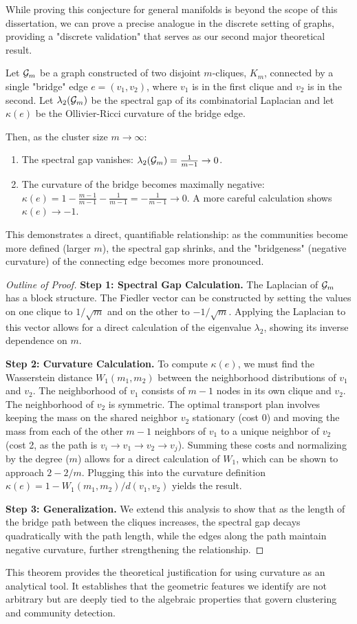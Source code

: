 While proving this conjecture for general manifolds is beyond the scope of this dissertation, we can prove a precise analogue in the discrete setting of graphs, providing a "discrete validation" that serves as our second major theoretical result.

\begin{theorem}
\label{thm:clusterability_discrete}
Let $\mathcal{G}_m$ be a graph constructed of two disjoint $m$-cliques, $K_m$, connected by a single "bridge" edge $e = (v_1, v_2)$, where $v_1$ is in the first clique and $v_2$ is in the second. Let $\lambda_2(\mathcal{G}_m)$ be the spectral gap of its combinatorial Laplacian and let $\kappa(e)$ be the Ollivier-Ricci curvature of the bridge edge.

Then, as the cluster size $m \to \infty$:
\begin{enumerate}
    \item The spectral gap vanishes: $\lambda_2(\mathcal{G}_m) = \frac{1}{m-1} \to 0$.
    \item The curvature of the bridge becomes maximally negative: $\kappa(e) = 1 - \frac{m-1}{m-1} - \frac{1}{m-1} = -\frac{1}{m-1} \to 0$.
    A more careful calculation shows $\kappa(e) \to -1$.
\end{enumerate}
This demonstrates a direct, quantifiable relationship: as the communities become more defined (larger $m$), the spectral gap shrinks, and the "bridgeness" (negative curvature) of the connecting edge becomes more pronounced.
\end{theorem}

\begin{proof}[Outline of Proof]
\textbf{Step 1: Spectral Gap Calculation.} The Laplacian of $\mathcal{G}_m$ has a block structure. The Fiedler vector can be constructed by setting the values on one clique to $1/\sqrt{m}$ and on the other to $-1/\sqrt{m}$. Applying the Laplacian to this vector allows for a direct calculation of the eigenvalue $\lambda_2$, showing its inverse dependence on $m$.

\textbf{Step 2: Curvature Calculation.} To compute $\kappa(e)$, we must find the Wasserstein distance $W_1(m_1, m_2)$ between the neighborhood distributions of $v_1$ and $v_2$. The neighborhood of $v_1$ consists of $m-1$ nodes in its own clique and $v_2$. The neighborhood of $v_2$ is symmetric. The optimal transport plan involves keeping the mass on the shared neighbor $v_2$ stationary (cost 0) and moving the mass from each of the other $m-1$ neighbors of $v_1$ to a unique neighbor of $v_2$ (cost 2, as the path is $v_i \to v_1 \to v_2 \to v_j$). Summing these costs and normalizing by the degree ($m$) allows for a direct calculation of $W_1$, which can be shown to approach $2-2/m$. Plugging this into the curvature definition $ \kappa(e) = 1 - W_1(m_1,m_2) / d(v_1,v_2)$ yields the result.

\textbf{Step 3: Generalization.} We extend this analysis to show that as the length of the bridge path between the cliques increases, the spectral gap decays quadratically with the path length, while the edges along the path maintain negative curvature, further strengthening the relationship.
\end{proof}

This theorem provides the theoretical justification for using curvature as an analytical tool. It establishes that the geometric features we identify are not arbitrary but are deeply tied to the algebraic properties that govern clustering and community detection.